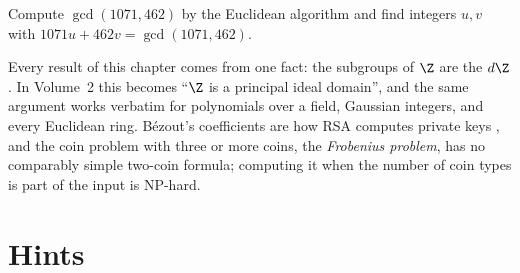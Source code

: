 \begin{exercise}[$\star$]\label{ex:t1-euclid1071}
Compute $\gcd(1071,462)$ by the Euclidean algorithm and find integers $u,v$ with $1071u+462v=\gcd(1071,462)$.
\end{exercise}

\begin{beauty}
Every result of this chapter comes from one fact: the subgroups of $\Z$ are the $d\Z$. In Volume~2 this becomes ``$\Z$ is a principal ideal domain'', and the same argument works verbatim for polynomials over a field, Gaussian integers, and every Euclidean ring. B\'ezout's coefficients are how RSA computes private keys , and the coin problem with three or more coins, the \emph{Frobenius problem}, has no comparably simple two-coin formula; computing it when the number of coin types is part of the input is NP-hard.
\end{beauty}

\section{Hints}

